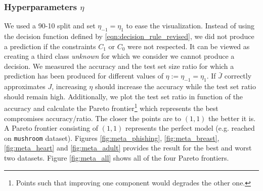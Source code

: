 \documentclass[preprint,12pt]{elsarticle}
\theoremstyle{definition}
\begin{document}
\subsubsection{Hyperparameters $\eta$} We used a 90-10 split and set $\eta_{-1} = \eta_1$ to ease the visualization. Instead of using the decision function defined by \eqref{eqn:decision_rule_revised}, we did not produce a prediction if the constraints $C_1$ or $C_0$ were not respected. It can be viewed as creating a third class {\it unknown} for which we consider we cannot produce a decision. We measured the accuracy and the test set size ratio for which a prediction has been produced for different values of $\eta := \eta_{-1} = \eta_1$. If $\bar J$ correctly approximates $J$, increasing $\eta$ should increase the accuracy while the test set ratio should remain high. Additionally, we plot the test set ratio in function of the accuracy and calculate the Pareto frontier\footnote{Points such that improving one component would degrades the other one.} which represents the best compromises accuracy/ratio. The closer the points are to $(1,1)$ the better it is. A Pareto frontier consisting of $(1,1)$ represents the perfect model (e.g. reached on \texttt{mushroom} dataset). Figures \ref{fig:meta_phishing}, \ref{fig:meta_breast}, \ref{fig:meta_heart} and \ref{fig:meta_adult} provides the result for the best and worst two datasets. Figure \ref{fig:meta_all} shows all of the four Pareto frontiers. 
\end{document}
